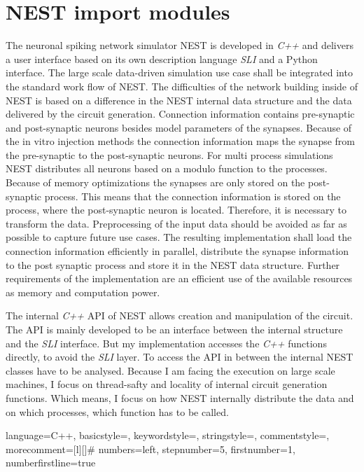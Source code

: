 \section{NEST import modules}
The neuronal spiking network simulator NEST is developed in \emph{C++} and delivers
a user interface based on its own description language \emph{SLI} and a Python interface.
The large scale data-driven simulation use case shall be integrated into the standard work flow of NEST.
The difficulties of the network building inside of NEST is based on a difference in 
the NEST internal data structure and the data delivered by the circuit generation.
Connection information contains pre-synaptic and post-synaptic neurons besides model parameters
of the synapses. Because of the in vitro injection methods the
connection information maps the synapse from the pre-synaptic to the post-synaptic neurons.
For multi process simulations NEST distributes all neurons based on a modulo function 
to the processes. Because of memory optimizations the synapses are only stored on the
post-synaptic process. This means that the connection information is stored
on the process, where the post-synaptic neuron is located.
Therefore, it is necessary to transform the data.
Preprocessing of the input data should be avoided as far as possible to capture
future use cases.
The resulting implementation shall load the connection information efficiently in parallel,
distribute the synapse information to the post synaptic process and store it in
the NEST data structure.
Further requirements of the implementation are an efficient use of the available resources as
memory and computation power. 

The internal \emph{C++} API of NEST allows creation and manipulation of the circuit.
The API is mainly developed to be an interface between the internal structure
and the \emph{SLI} interface. But my implementation accesses the \emph{C++} functions directly,
to avoid the \emph{SLI} layer. To access the API in between the internal NEST classes
have to be analysed. Because I am facing the execution on large scale machines,
I focus on thread-safty and locality of internal circuit generation functions.
Which means, I focus on how NEST internally distribute the data and on which processes, which
function has to be called.


 {language=C++,
                basicstyle=\small\ttfamily,
                keywordstyle=\color{blue}\ttfamily,
                stringstyle=\color{red}\ttfamily,
                commentstyle=\color{green}\ttfamily,
                morecomment=[l][\color{magenta}]{\#}
                numbers=left,
  				stepnumber=5,    
  				firstnumber=1,
 				numberfirstline=true
}

